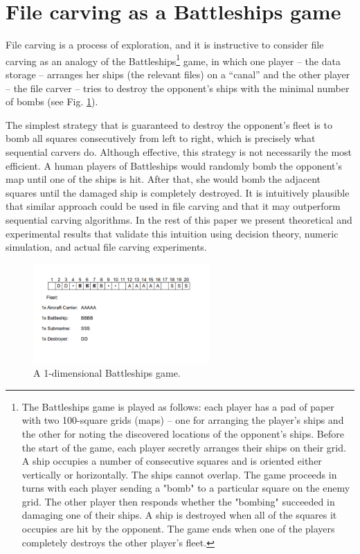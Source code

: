 \documentclass[final,5p,times,twocolumn,authoryear]{elsarticle}
\begin{document}
\section{File carving as a Battleships game}

File carving is a process of exploration, and it is instructive to consider file carving as an analogy of the Battleships\footnote{The Battleships game is played as follows: each player has a pad of paper with two 100-square grids (maps) -- one for arranging the player's ships and the other for noting the discovered locations of the opponent's ships. Before the start of the game, each player secretly arranges their ships on their grid. A ship occupies a number of consecutive squares and is oriented either vertically or horizontally. The ships cannot overlap. The game proceeds in turns with each player sending a "bomb" to a particular square on the enemy grid. The other player then responds whether the "bombing" succeeded in damaging one of their ships. A ship is destroyed when all of the squares it occupies are hit by the opponent. The game ends when one of the players completely destroys the other player's fleet.} game, in which one player -- the data storage -- arranges her ships (the relevant files) on a ``canal'' and the other player -- the file carver -- tries to destroy the opponent's ships with the minimal number of bombs (see Fig. \ref{fig:battleships_on_a_canal}).  

The simplest strategy that is guaranteed to destroy the opponent's fleet is to bomb all squares consecutively from left to right, which is precisely what sequential carvers do. Although effective, this strategy is not necessarily the most efficient. A human players of Battleships would randomly bomb the opponent's map until one of the ships is hit. After that, she would bomb the adjacent squares until the damaged ship is completely destroyed. It is intuitively plausible that similar approach could be used in file carving and that it may outperform sequential carving algorithms. In the rest of this paper we present theoretical and experimental results that validate this intuition using decision theory, numeric simulation, and actual file carving experiments.

\begin{figure}
  \centerline{\includegraphics[width=0.6\textwidth]{figures/fig3}}
  \caption{A 1-dimensional Battleships game.}
  \label{fig:battleships_on_a_canal}
\end{figure}
\end{document}
